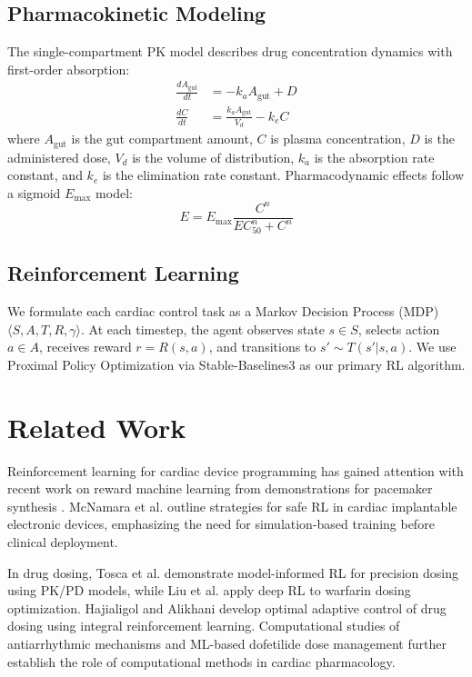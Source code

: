 \documentclass[11pt,a4paper]{article}
\begin{document}
\subsection{Pharmacokinetic Modeling}

The single-compartment PK model describes drug concentration dynamics with first-order absorption:
\begin{align}
    \frac{dA_{\text{gut}}}{dt} &= -k_a A_{\text{gut}} + D \\
    \frac{dC}{dt} &= \frac{k_a A_{\text{gut}}}{V_d} - k_e C
\end{align}
where $A_{\text{gut}}$ is the gut compartment amount, $C$ is plasma concentration, $D$ is the administered dose, $V_d$ is the volume of distribution, $k_a$ is the absorption rate constant, and $k_e$ is the elimination rate constant. Pharmacodynamic effects follow a sigmoid $E_{\max}$ model:
\begin{equation}
    E = E_{\max} \frac{C^n}{EC_{50}^n + C^n}
\end{equation}

\subsection{Reinforcement Learning}

We formulate each cardiac control task as a Markov Decision Process (MDP) $\langle S, A, T, R, \gamma \rangle$. At each timestep, the agent observes state $s \in S$, selects action $a \in A$, receives reward $r = R(s, a)$, and transitions to $s' \sim T(s'|s,a)$. We use Proximal Policy Optimization \citep{schulman2017proximal} via Stable-Baselines3 \citep{raffin2021stable} as our primary RL algorithm.

\section{Related Work}

Reinforcement learning for cardiac device programming has gained attention with recent work on reward machine learning from demonstrations for pacemaker synthesis \citep{jiang2024reward}. McNamara et al. \citep{mcnamara2025safe} outline strategies for safe RL in cardiac implantable electronic devices, emphasizing the need for simulation-based training before clinical deployment.

In drug dosing, Tosca et al. \citep{tosca2024model} demonstrate model-informed RL for precision dosing using PK/PD models, while Liu et al. \citep{liu2022optimizing} apply deep RL to warfarin dosing optimization. Hajialigol and Alikhani \citep{hajialigol2019optimal} develop optimal adaptive control of drug dosing using integral reinforcement learning. Computational studies of antiarrhythmic mechanisms \citep{dutta2024simulation} and ML-based dofetilide dose management \citep{plos2019dofetilide} further establish the role of computational methods in cardiac pharmacology.
\end{document}
